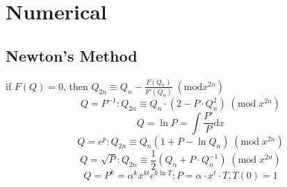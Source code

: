 \chapter{Numerical}

\section{Newton's Method}
if $F(Q) = 0$, then $Q_{2n} \equiv Q_{n} - \frac{F(Q_{n})}{F'(Q_{n})}\;(\mathrm{mod} x^{2n})$ 
\[Q = P^{-1}: Q_{2n} \equiv Q_{n} \cdot (2 - P \cdot Q_{n}^2)\;(\mathrm{mod}\; x^{2n}) \]
\[Q = \ln{P} = \int\frac{P'}{P} \mathrm{d}x \]
\[Q = e^{p}: Q_{2n} \equiv Q_{n}(1 + P - \ln{Q_n})\;(\mathrm{mod}\; x^{2n}) \]
\[Q = \sqrt{P}: Q_{2n} \equiv \frac{1}{2}(Q_{n} + P \cdot Q_{n}^{-1})\;(\mathrm{mod}\; x^{2n}) \]
\[Q = P^{k} = \alpha^{k}x^{kt}e^{k\ln{T}}; P = \alpha \cdot x^{t} \cdot T, T(0) = 1 \]